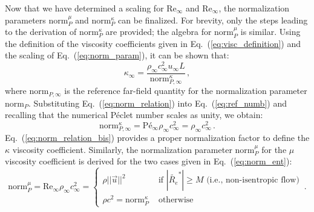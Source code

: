 \documentclass[preprint,10pt]{elsarticle}
\newcommand{\norm}{\textrm{norm}}
\renewcommand{\Re}{\textrm{Re}}
\newcommand{\Pe}{\textrm{P\'e}}
\newcommand{\resi}{R_e}
\newcommand{\resinew}{\widetilde{\resi}}
\newcommand{\eqt}[1]{Eq.~(\ref{#1})}                     %
\newcommand{\sct}[1]{Section~\ref{#1}}                   %
\begin{document}
Now that we have determined a scaling for $\Re_\infty$ and $\Re_\infty$, the normalization parameters $\norm_P^\mu$ and $\norm_P^\kappa$ can be finalized. For brevity, only the steps leading to the derivation of $\norm_P^\kappa$ are provided; the algebra for $\norm_P^\mu$ is similar. Using the definition of the viscosity coefficients given in \eqt{eq:visc_definition} and the scaling of \eqt{eq:norm_param}, it can be shown that:
%
\begin{equation}
\label{eq:norm_relation}
\kappa_\infty = \frac{ \rho_\infty c_\infty^2 u_\infty L }{ \norm_{P,\infty}^{\kappa} } \, ,
\end{equation}
%
where $\norm_{P,\infty}$ is the reference far-field quantity for the normalization parameter $\norm_P$. Substituting \eqt{eq:norm_relation} into \eqt{eq:ref_numb} and recalling that the numerical P\'eclet number scales as unity, we obtain:
%
\begin{equation}
\label{eq:norm_relation_bis}
\norm_{P,\infty}^{\kappa} = \Pe_\infty \rho_\infty c_\infty^2 = \rho_\infty c_\infty^2 \, .
\end{equation}
%
\eqt{eq:norm_relation_bis} provides a proper normalization factor to define the $\kappa$ viscosity coefficient.
Similarly, the normalization parameter $\norm_P^\mu$ for the $\mu$ viscosity coefficient is derived for the two cases given in \eqt{eq:norm_ent}:
%
\begin{equation}
\label{eq:norm_ent2}
\norm_P^\mu = \Re_\infty \rho_\infty c_\infty^2 =  \left\{
\begin{array}{ll}
 \rho ||\vec{u} ||^2       & \text{ if } \left| \resinew^* \right| \geq M \text{ (i.e., non-isentropic flow)} \\
 \rho c^2 = \norm_P^\kappa & \text{ otherwise}
\end{array}
\right. \,.
\end{equation}
%
\end{document}
